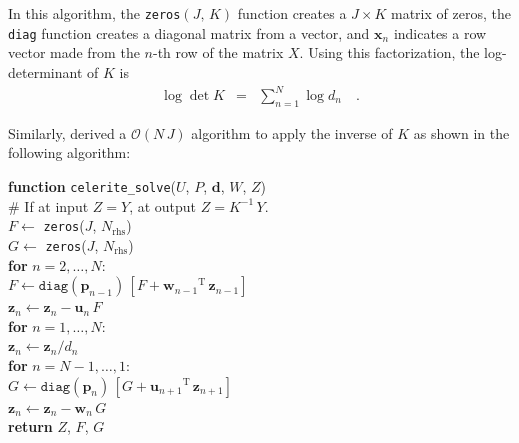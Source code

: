 \documentclass[rnaas]{aastex62}
\newcommand{\T}{\ensuremath{\mathrm{T}}}
\newcommand{\bvec}[1]{{\ensuremath{\boldsymbol{#1}}}}
\begin{document}
\noindent In this algorithm, the \texttt{zeros}$(J,\,K)$ function creates a $J
\times K$ matrix of zeros, the \texttt{diag} function creates a diagonal
matrix from a vector, and $\bvec{x}_n$ indicates a row vector made from the
$n$-th row of the matrix $X$.
Using this factorization, the log-determinant of $K$ is
\begin{eqnarray}
\log \det K &=& \sum_{n=1}^N \log d_{n} \quad.
\end{eqnarray}

Similarly, \citet{Foreman-Mackey:2017} derived a $\mathcal{O}(N\,J)$ algorithm
to apply the inverse of $K$ as shown in the following algorithm:

\medskip
\begin{minipage}{\linewidth}
\textbf{function} \texttt{celerite\_solve}($U$, $P$, $\bvec{d}$, $W$, $Z$) \\
\hspace*{2em}\textsf{\# If at input $Z = Y$, at output $Z = K^{-1}\,Y$.} \\
\hspace*{2em}$F \gets$ \texttt{zeros}($J$, $N_\mathrm{rhs}$) \\
\hspace*{2em}$G \gets$ \texttt{zeros}($J$, $N_\mathrm{rhs}$) \\
\hspace*{2em}\textbf{for} $n = 2,\ldots,N$:\\
\hspace*{2em}\hspace*{2em}$F \gets \texttt{diag}(\bvec{p}_{n-1})\,[F +
    {\bvec{w}_{n-1}}^\T\,\bvec{z}_{n-1}]$\\
\hspace*{2em}\hspace*{2em}$\bvec{z}_n \gets \bvec{z}_n - \bvec{u}_n\,F$\\
\hspace*{2em}\textbf{for} $n = 1,\ldots,N$:\\
\hspace*{2em}\hspace*{2em}$\bvec{z}_n \gets \bvec{z}_n / d_{n}$\\
\hspace*{2em}\textbf{for} $n = N-1,\ldots,1$:\\
\hspace*{2em}\hspace*{2em}$G \gets \texttt{diag}(\bvec{p}_{n})\,[G +
    {\bvec{u}_{n+1}}^\T\,\bvec{z}_{n+1}]$\\
    \hspace*{2em}\hspace*{2em}$\bvec{z}_n \gets \bvec{z}_n - \bvec{w}_n\,G$\\
\hspace*{2em}\textbf{return} $Z$, $F$, $G$
\end{minipage}
\medskip
\end{document}
